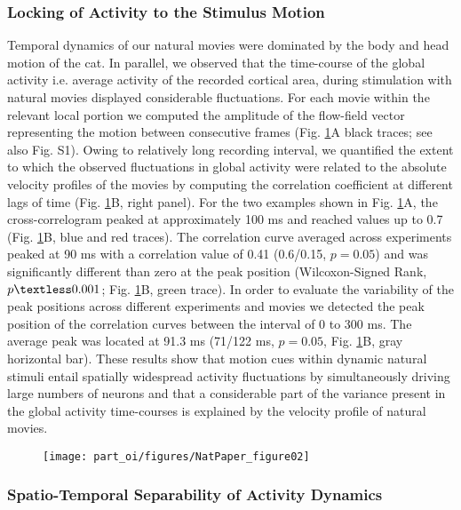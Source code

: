 \subsubsection{Locking of Activity to the Stimulus Motion}

\label{oi_motionlock}

Temporal dynamics of our natural movies were dominated by the body and
head motion of the cat. In parallel, we observed that the time-course of
the global activity i.e. average activity of the recorded cortical area,
during stimulation with natural movies displayed considerable fluctuations.
For each movie within the relevant local portion we computed the amplitude
of the flow-field vector representing the motion between consecutive frames
(Fig. \ref{np2}A black traces; see also Fig. S1). Owing to relatively long
recording interval, we quantified the extent to which the observed
fluctuations in global activity were related to the absolute velocity
profiles of the movies by computing the correlation coefficient at
different lags of time (Fig. \ref{np2}B, right panel). For the two examples shown
in Fig. \ref{np2}A, the cross-correlogram peaked at approximately 100 ms and
reached values up to 0.7 (Fig. \ref{np2}B, blue and red traces). The correlation
curve averaged across experiments peaked at 90 ms with a correlation value
of 0.41 (0.6/0.15, $p = 0.05$) and was significantly different than zero at
the peak position (Wilcoxon-Signed Rank, $p \textless 0.001$; Fig.
\ref{np2}B, green trace). In order to evaluate the variability of the peak
positions across different experiments and movies we detected the peak
position of the correlation curves between the interval of 0 to 300 ms. The
average peak was located at 91.3 ms (71/122 ms, $p = 0.05$, Fig.
\ref{np2}B, gray horizontal bar). These results show that motion cues
within dynamic natural stimuli entail spatially widespread activity
fluctuations by simultaneously driving large numbers of neurons and that a
considerable part of the variance present in the global activity
time-courses is explained by the velocity profile of natural movies. 


\begin{figure}[!t] \centerline{
\texttt{[image: part\_oi/figures/NatPaper\_figure02]}
} 
\caption[Motion Locking of Average Activity.]{ \protect} 
\label{np2}
\end{figure} 

\subsubsection{Spatio-Temporal Separability of Activity Dynamics}


